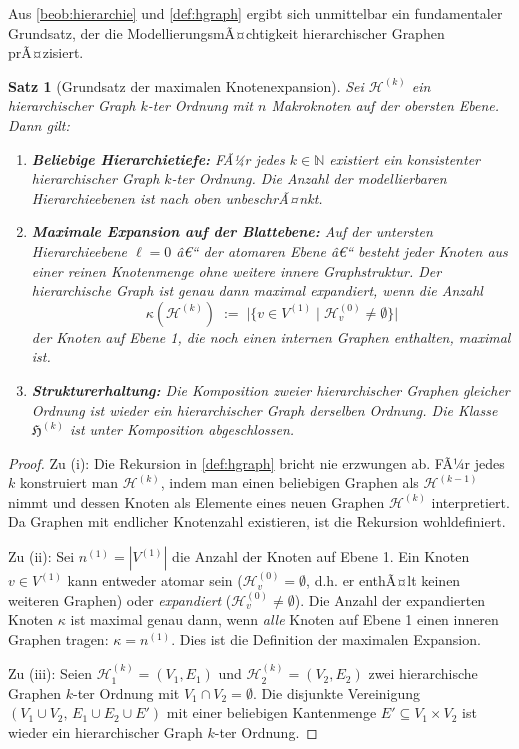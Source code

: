 ﻿\documentclass[12pt,a4paper,twoside]{article}
\theoremstyle{definition}
\theoremstyle{plain}
\newtheorem{theorem}{Satz}[section]
\theoremstyle{remark}
\begin{document}
Aus \cref{beob:hierarchie} und \cref{def:hgraph} ergibt sich unmittelbar
ein fundamentaler Grundsatz, der die ModellierungsmÃ¤chtigkeit
hierarchischer Graphen prÃ¤zisiert.

\begin{theorem}[Grundsatz der maximalen Knotenexpansion]
	\label{thm:maxexpansion}
	Sei $\mathcal{H}^{(k)}$ ein hierarchischer Graph $k$-ter Ordnung mit
	$n$ Makroknoten auf der obersten Ebene.  Dann gilt:
	
	\begin{enumerate}[label=\textbf{(\roman*)}]
		\item \textbf{Beliebige Hierarchietiefe:} FÃ¼r jedes $k \in \mathbb{N}$
		existiert ein konsistenter hierarchischer Graph $k$-ter Ordnung.
		Die Anzahl der modellierbaren Hierarchieebenen ist nach oben
		unbeschrÃ¤nkt.
		
		\item \textbf{Maximale Expansion auf der Blattebene:}
		Auf der untersten Hierarchieebene $\ell = 0$ â€“ der
		\emph{atomaren Ebene} â€“ besteht jeder Knoten aus einer
		reinen Knotenmenge ohne weitere innere Graphstruktur.
		Der hierarchische Graph ist genau dann \emph{maximal
			expandiert}, wenn die Anzahl
		\[
		\kappa(\mathcal{H}^{(k)}) \;:=\;
		\bigl|\{v \in V^{(1)} \mid \mathcal{H}^{(0)}_v \neq \emptyset\}\bigr|
		\]
		der Knoten auf Ebene 1, die noch einen internen Graphen
		enthalten, \emph{maximal} ist.
		
		\item \textbf{Strukturerhaltung:} Die Komposition zweier
		hierarchischer Graphen gleicher Ordnung ist wieder ein
		hierarchischer Graph derselben Ordnung.  Die Klasse
		$\mathfrak{H}^{(k)}$ ist unter Komposition abgeschlossen.
	\end{enumerate}
\end{theorem}

\begin{proof}
	Zu (i): Die Rekursion in \cref{def:hgraph} bricht nie erzwungen ab.
	FÃ¼r jedes $k$ konstruiert man $\mathcal{H}^{(k)}$, indem man einen
	beliebigen Graphen als $\mathcal{H}^{(k-1)}$ nimmt und dessen Knoten
	als Elemente eines neuen Graphen $\mathcal{H}^{(k)}$ interpretiert.
	Da Graphen mit endlicher Knotenzahl existieren, ist die Rekursion
	wohldefiniert.
	
	Zu (ii): Sei $n^{(1)} = |V^{(1)}|$ die Anzahl der Knoten auf Ebene 1.
	Ein Knoten $v \in V^{(1)}$ kann entweder atomar sein ($\mathcal{H}^{(0)}_v = \emptyset$,
	d.h. er enthÃ¤lt keinen weiteren Graphen) oder \emph{expandiert}
	($\mathcal{H}^{(0)}_v \neq \emptyset$).  Die Anzahl der expandierten
	Knoten $\kappa$ ist maximal genau dann, wenn \emph{alle} Knoten auf
	Ebene 1 einen inneren Graphen tragen: $\kappa = n^{(1)}$.  Dies ist
	die Definition der maximalen Expansion.
	
	Zu (iii): Seien $\mathcal{H}^{(k)}_1 = (V_1, E_1)$ und
	$\mathcal{H}^{(k)}_2 = (V_2, E_2)$ zwei hierarchische Graphen
	$k$-ter Ordnung mit $V_1 \cap V_2 = \emptyset$.  Die disjunkte
	Vereinigung $(V_1 \cup V_2,\, E_1 \cup E_2 \cup E')$ mit einer
	beliebigen Kantenmenge $E' \subseteq V_1 \times V_2$ ist wieder ein
	hierarchischer Graph $k$-ter Ordnung.\qquad
\end{proof}
\end{document}
